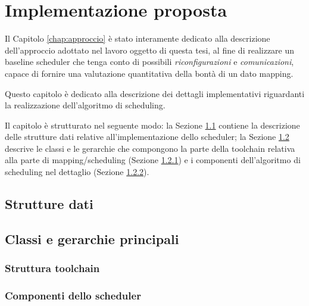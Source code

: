 \chapter{Implementazione proposta}
\label{chap:implementazione}
\vspace{1cm}
Il Capitolo \ref{chap:approccio} è stato interamente dedicato alla descrizione 
dell'approccio adottato nel lavoro oggetto di questa tesi, al fine di 
realizzare un baseline scheduler che tenga conto di possibili 
\emph{riconfigurazioni} e \emph{comunicazioni}, capace di fornire una 
valutazione quantitativa della bontà di un dato mapping.

Questo capitolo è dedicato alla descrizione dei dettagli implementativi 
riguardanti la realizzazione dell'algoritmo di scheduling.

Il capitolo è strutturato nel seguente modo: la Sezione \ref{sec:struttureDati} 
contiene la descrizione delle strutture dati relative all'implementazione dello 
scheduler; la Sezione \ref{sec:classiGerarchie} descrive le classi e le 
gerarchie che compongono la parte della toolchain relativa alla parte di 
mapping/scheduling (Sezione \ref{subsec:strutturaToolchain}) e i componenti 
dell'algoritmo di scheduling nel dettaglio (Sezione 
\ref{subsec:componentiScheduler}).


\section{Strutture dati}
\label{sec:struttureDati}


\section{Classi e gerarchie principali}
\label{sec:classiGerarchie}


\subsection{Struttura toolchain}
\label{subsec:strutturaToolchain}


\subsection{Componenti dello scheduler}
\label{subsec:componentiScheduler}

